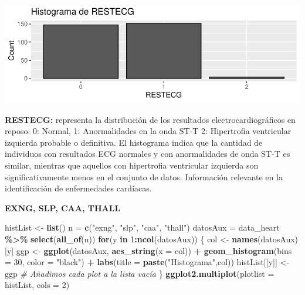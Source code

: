 \documentclass[
]{article}
\newenvironment{Shaded}{\begin{snugshade}}{\end{snugshade}}
\newcommand{\AttributeTok}[1]{\textcolor[rgb]{0.13,0.29,0.53}{#1}}
\newcommand{\CommentTok}[1]{\textcolor[rgb]{0.56,0.35,0.01}{\textit{#1}}}
\newcommand{\ControlFlowTok}[1]{\textcolor[rgb]{0.13,0.29,0.53}{\textbf{#1}}}
\newcommand{\DecValTok}[1]{\textcolor[rgb]{0.00,0.00,0.81}{#1}}
\newcommand{\FunctionTok}[1]{\textcolor[rgb]{0.13,0.29,0.53}{\textbf{#1}}}
\newcommand{\NormalTok}[1]{#1}
\newcommand{\OtherTok}[1]{\textcolor[rgb]{0.56,0.35,0.01}{#1}}
\newcommand{\SpecialCharTok}[1]{\textcolor[rgb]{0.81,0.36,0.00}{\textbf{#1}}}
\newcommand{\StringTok}[1]{\textcolor[rgb]{0.31,0.60,0.02}{#1}}
\begin{document}
\includegraphics{coyolaf_ChristianOyola-PRA2_files/figure-latex/unnamed-chunk-12-1.pdf}

\textbf{RESTECG:} representa la distribución de los resultados
electrocardiográficos en reposo: 0: Normal, 1: Anormalidades en la onda
ST-T 2: Hipertrofia ventricular izquierda probable o definitiva. El
histograma indica que la cantidad de individuos con resultados ECG
normales y con anormalidades de onda ST-T es similar, mientras que
aquellos con hipertrofia ventricular izquierda son significativamente
menos en el conjunto de datos. Información relevante en la
identificación de enfermedades cardíacas.

\textbf{EXNG, SLP, CAA, THALL}

\begin{Shaded}
\begin{Highlighting}[]
\NormalTok{histList }\OtherTok{\textless{}{-}} \FunctionTok{list}\NormalTok{()}
\NormalTok{n }\OtherTok{=} \FunctionTok{c}\NormalTok{(}\StringTok{"exng"}\NormalTok{, }\StringTok{"slp"}\NormalTok{, }\StringTok{"caa"}\NormalTok{, }\StringTok{"thall"}\NormalTok{)}
\NormalTok{datosAux }\OtherTok{=}\NormalTok{ data\_heart }\SpecialCharTok{\%\textgreater{}\%} \FunctionTok{select}\NormalTok{(}\FunctionTok{all\_of}\NormalTok{(n))}
\ControlFlowTok{for}\NormalTok{(y }\ControlFlowTok{in} \DecValTok{1}\SpecialCharTok{:}\FunctionTok{ncol}\NormalTok{(datosAux)) \{}
\NormalTok{  col }\OtherTok{\textless{}{-}} \FunctionTok{names}\NormalTok{(datosAux)[y]}
\NormalTok{  ggp }\OtherTok{\textless{}{-}} \FunctionTok{ggplot}\NormalTok{(datosAux, }\FunctionTok{aes\_string}\NormalTok{(}\AttributeTok{x =}\NormalTok{ col)) }\SpecialCharTok{+}
    \FunctionTok{geom\_histogram}\NormalTok{(}\AttributeTok{bins =} \DecValTok{30}\NormalTok{, }\AttributeTok{color =} \StringTok{"black"}\NormalTok{) }\SpecialCharTok{+}
    \FunctionTok{labs}\NormalTok{(}\AttributeTok{title =} \FunctionTok{paste}\NormalTok{(}\StringTok{"Histograma"}\NormalTok{,col))}
\NormalTok{  histList[[y]] }\OtherTok{\textless{}{-}}\NormalTok{ ggp }\CommentTok{\# Añadimos cada plot a la lista vacía}
\NormalTok{\}}
\FunctionTok{ggplot2.multiplot}\NormalTok{(}\AttributeTok{plotlist =}\NormalTok{ histList, }\AttributeTok{cols =} \DecValTok{2}\NormalTok{)}
\end{Highlighting}
\end{Shaded}
\end{document}
